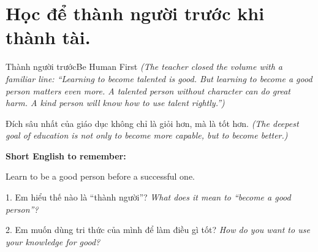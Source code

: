 \section{Học để thành người trước khi thành tài.}
\begin{truyen}{Thành người trước}{Be Human First}
\textit{(The teacher closed the volume with a familiar line: ``Learning to become talented is good. But learning to become a good person matters even more. A talented person without character can do great harm. A kind person will know how to use talent rightly.'')}
\end{truyen}

\begin{baihoc}
Đích sâu nhất của giáo dục không chỉ là giỏi hơn, mà là tốt hơn.
\textit{(The deepest goal of education is not only to become more capable, but to become better.)}
\end{baihoc}

\begin{ghinhoanh}
\textbf{Short English to remember:}

Learn to be a good person before a successful one.

\end{ghinhoanh}

\begin{tuhocnhanh}
1. Em hiểu thế nào là “thành người”? \textit{What does it mean to “become a good person”?}

2. Em muốn dùng tri thức của mình để làm điều gì tốt? \textit{How do you want to use your knowledge for good?}
\end{tuhocnhanh}
\ngancach